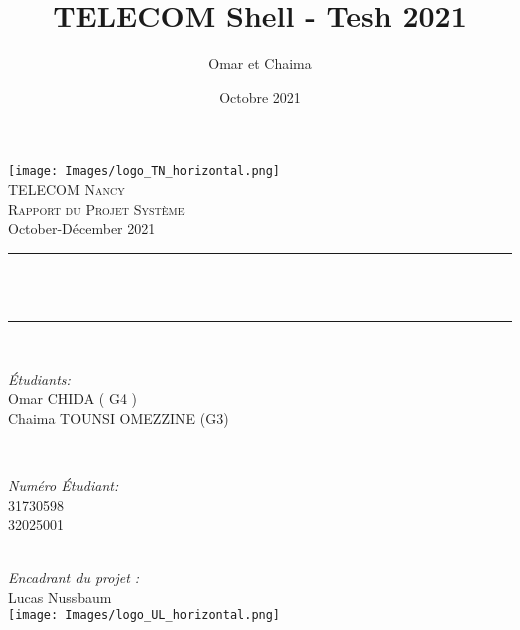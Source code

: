 \documentclass[12pt]{article}
\title{TELECOM Shell - Tesh 2021} %
\author{Omar et Chaima}
\date{Octobre 2021}
\makeatletter
\let\thetitle\@title
\makeatother
\begin{document}
\begin{titlepage}

\centering
    
 	\texttt{[image: Images/logo\_TN\_horizontal.png]}\\[1.0 cm]
 	
	\textsc{\LARGE TELECOM Nancy}\\[1.5 cm]
	\textsc{\Large Rapport du Projet Système}\\[0.5 cm]
	{\large October-Décember 2021}\\[0.5 cm]
	\rule{\linewidth}{0.2 mm} \\[0.5 cm]
	{ \huge \bfseries \thetitle}\\[0.2 cm]
	\rule{\linewidth}{0.2 mm} \\[1.5 cm]
	
	\begin{minipage}{0.45\textwidth}
		\begin{flushleft} \large
		\emph{Étudiants:}\\
			Omar CHIDA                  ( G4 )\\
			Chaima TOUNSI OMEZZINE (G3)
		\end{flushleft}
	\end{minipage}~
	\begin{minipage}{0.4\textwidth}
		\begin{flushright} \large
		\emph{Numéro Étudiant:}\\
			31730598 \\
			32025001 
		\end{flushright}
	\end{minipage}\\[1.4 cm]
	
	\large
	\emph{Encadrant du projet :}\\
	   Lucas Nussbaum\\[1.5 cm]

	\texttt{[image: Images/logo\_UL\_horizontal.png]}\\[1.5 cm]

	\vfill
\end{titlepage}

\newpage

\tableofcontents

\newpage



  
\end{document}
